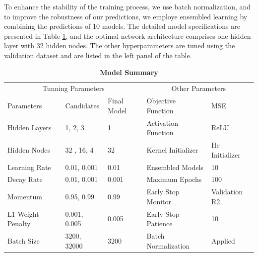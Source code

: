 To enhance the stability of the training process, we use batch normalization, and to improve the robustness of our predictions, we employe ensembled learning by combining the predictions of 10 models. The detailed model specifications are presented in Table \ref{table: model summary}, and the optimal network architecture comprises one hidden layer with 32 hidden nodes. The other hyperparameters are tuned using the validation dataset and are listed in the left panel of the table.

\begin{table}[H]
  \centering
  \caption{\textbf{Model Summary}}
  \begin{tabular}{lllll}
  \hline
      \multicolumn{3}{c}{Tunning Parameters} & \multicolumn{2}{c}{Other Parameters}\\ \cline{4-5}
      Parameters & Candidates & Final Model & Objective Function & MSE \\ \cline{1-3}
      Hidden Layers  & 1, 2, 3 & 1 & Activation Function  & ReLU \\ 
      Hidden Nodes  & 32 , 16, 4 & 32 & Kernel Initializer & He Initializer \\ 
      Learning Rate & 0.01, 0.001 & 0.01 & Ensembled Models & 10 \\ 
      Decay Rate & 0.01, 0.001 & 0.001 & Maximum Epochs & 100 \\ 
      Momentum & 0.95, 0.99 & 0.99 & Early Stop Monitor  & Validation R2 \\ 
      L1 Weight Penalty & 0.001, 0.005 & 0.005 & Early Stop Patience & 10 \\ 
      Batch Size  & 3200, 32000 & 3200 & Batch Normalization & Applied \\ \hline
  \end{tabular}
  \label{table: model summary}
\end{table}

